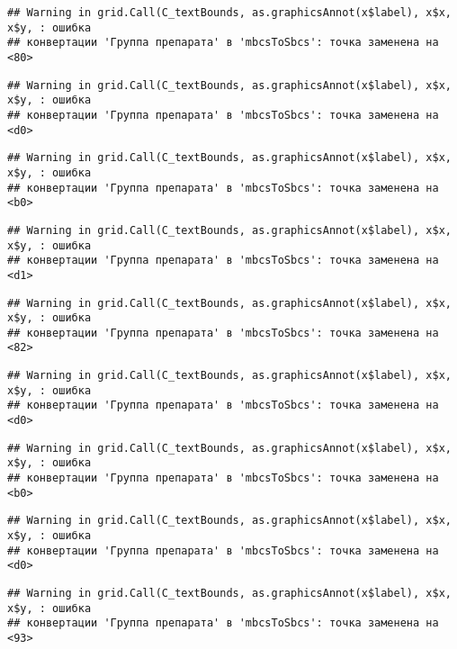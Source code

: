 \documentclass[
]{article}
\begin{document}
\begin{verbatim}
## Warning in grid.Call(C_textBounds, as.graphicsAnnot(x$label), x$x, x$y, : ошибка
## конвертации 'Группа препарата' в 'mbcsToSbcs': точка заменена на <80>
\end{verbatim}

\begin{verbatim}
## Warning in grid.Call(C_textBounds, as.graphicsAnnot(x$label), x$x, x$y, : ошибка
## конвертации 'Группа препарата' в 'mbcsToSbcs': точка заменена на <d0>
\end{verbatim}

\begin{verbatim}
## Warning in grid.Call(C_textBounds, as.graphicsAnnot(x$label), x$x, x$y, : ошибка
## конвертации 'Группа препарата' в 'mbcsToSbcs': точка заменена на <b0>
\end{verbatim}

\begin{verbatim}
## Warning in grid.Call(C_textBounds, as.graphicsAnnot(x$label), x$x, x$y, : ошибка
## конвертации 'Группа препарата' в 'mbcsToSbcs': точка заменена на <d1>
\end{verbatim}

\begin{verbatim}
## Warning in grid.Call(C_textBounds, as.graphicsAnnot(x$label), x$x, x$y, : ошибка
## конвертации 'Группа препарата' в 'mbcsToSbcs': точка заменена на <82>
\end{verbatim}

\begin{verbatim}
## Warning in grid.Call(C_textBounds, as.graphicsAnnot(x$label), x$x, x$y, : ошибка
## конвертации 'Группа препарата' в 'mbcsToSbcs': точка заменена на <d0>
\end{verbatim}

\begin{verbatim}
## Warning in grid.Call(C_textBounds, as.graphicsAnnot(x$label), x$x, x$y, : ошибка
## конвертации 'Группа препарата' в 'mbcsToSbcs': точка заменена на <b0>
\end{verbatim}

\begin{verbatim}
## Warning in grid.Call(C_textBounds, as.graphicsAnnot(x$label), x$x, x$y, : ошибка
## конвертации 'Группа препарата' в 'mbcsToSbcs': точка заменена на <d0>
\end{verbatim}

\begin{verbatim}
## Warning in grid.Call(C_textBounds, as.graphicsAnnot(x$label), x$x, x$y, : ошибка
## конвертации 'Группа препарата' в 'mbcsToSbcs': точка заменена на <93>
\end{verbatim}
\end{document}
